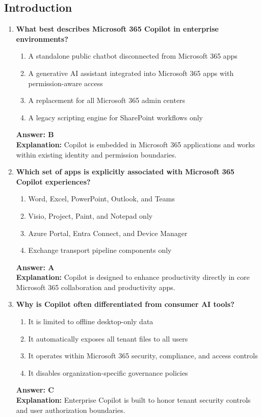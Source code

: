 \documentclass[10pt]{article}
\begin{document}
\subsection{Introduction}
\begin{enumerate}[leftmargin=*]

\item \textbf{What best describes Microsoft 365 Copilot in enterprise environments?}
\begin{enumerate}[label=\Alph*.]
  \item A standalone public chatbot disconnected from Microsoft 365 apps
  \item A generative AI assistant integrated into Microsoft 365 apps with permission-aware access
  \item A replacement for all Microsoft 365 admin centers
  \item A legacy scripting engine for SharePoint workflows only
\end{enumerate}
\textbf{Answer: B}\\
\textbf{Explanation:} Copilot is embedded in Microsoft 365 applications and works within existing identity and permission boundaries.

\item \textbf{Which set of apps is explicitly associated with Microsoft 365 Copilot experiences?}
\begin{enumerate}[label=\Alph*.]
  \item Word, Excel, PowerPoint, Outlook, and Teams
  \item Visio, Project, Paint, and Notepad only
  \item Azure Portal, Entra Connect, and Device Manager
  \item Exchange transport pipeline components only
\end{enumerate}
\textbf{Answer: A}\\
\textbf{Explanation:} Copilot is designed to enhance productivity directly in core Microsoft 365 collaboration and productivity apps.

\item \textbf{Why is Copilot often differentiated from consumer AI tools?}
\begin{enumerate}[label=\Alph*.]
  \item It is limited to offline desktop-only data
  \item It automatically exposes all tenant files to all users
  \item It operates within Microsoft 365 security, compliance, and access controls
  \item It disables organization-specific governance policies
\end{enumerate}
\textbf{Answer: C}\\
\textbf{Explanation:} Enterprise Copilot is built to honor tenant security controls and user authorization boundaries.


\end{enumerate}
\end{document}
